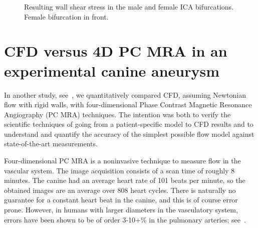 \begin{figure}
  \begin{center}
    \caption{Resulting wall shear stress in the male and female ICA
      bifurcations. Female bifurcation in front.}
    \label{fig:kvs-2:ica_wss_res}
  \end{center}
\end{figure}

\section{CFD versus 4D PC MRA in an experimental canine aneurysm} \label{dog_study}

In another study, see~\citet{JiangJohnsonValen-SendstadEtAl2010}, we
quantitatively compared CFD, assuming Newtonian flow with rigid walls,
with four-dimensional Phase Contrast Magnetic Resonance Angiography
(PC MRA) techniques. The intention was both to verify the scientific
techniques of going from a patient-specific model to CFD results and
to understand and quantify the accuracy of the simplest possible flow
model against state-of-the-art measurements.

Four-dimensional PC MRA is a noninvasive technique to measure flow in
the vascular system. The image acquisition consists of a scan time of
roughly 8 minutes. The canine had  an average heart rate
of 101 beats per minute,
so the obtained images are an average over 808 heart cycles. There is
naturally no guarantee for a constant heart beat in the canine, and
this is of course error prone. However, in humans with larger
diameters in the vasculatory system, errors have been shown to be of
order 3-10+\% in the pulmonary arteries;
see~\citet{LotzMeierLeppertEtAl2002,EvansIwaiGristEtAl1993}.

